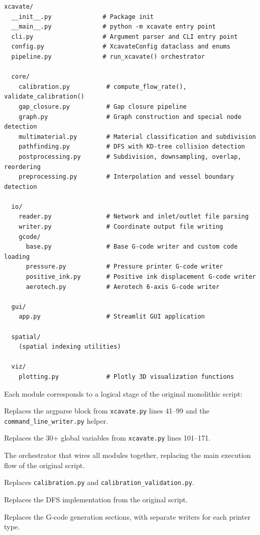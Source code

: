 \documentclass[11pt,letterpaper]{article}
\newcommand{\code}[1]{\texttt{#1}}
\begin{document}
\begin{lstlisting}
xcavate/
  __init__.py              # Package init
  __main__.py              # python -m xcavate entry point
  cli.py                   # Argument parser and CLI entry point
  config.py                # XcavateConfig dataclass and enums
  pipeline.py              # run_xcavate() orchestrator

  core/
    calibration.py          # compute_flow_rate(), validate_calibration()
    gap_closure.py          # Gap closure pipeline
    graph.py                # Graph construction and special node detection
    multimaterial.py        # Material classification and subdivision
    pathfinding.py          # DFS with KD-tree collision detection
    postprocessing.py       # Subdivision, downsampling, overlap, reordering
    preprocessing.py        # Interpolation and vessel boundary detection

  io/
    reader.py               # Network and inlet/outlet file parsing
    writer.py               # Coordinate output file writing
    gcode/
      base.py               # Base G-code writer and custom code loading
      pressure.py           # Pressure printer G-code writer
      positive_ink.py       # Positive ink displacement G-code writer
      aerotech.py           # Aerotech 6-axis G-code writer

  gui/
    app.py                  # Streamlit GUI application

  spatial/
    (spatial indexing utilities)

  viz/
    plotting.py             # Plotly 3D visualization functions
\end{lstlisting}

\begin{claudebox}
Each module corresponds to a logical stage of the original monolithic script:
\begin{description}[leftmargin=1cm,nosep]
    \item[\code{cli.py}] Replaces the argparse block from \code{xcavate.py}
    lines 41--99 and the \code{command\_line\_writer.py} helper.
    \item[\code{config.py}] Replaces the 30+ global variables from
    \code{xcavate.py} lines 101--171.
    \item[\code{pipeline.py}] The orchestrator that wires all modules together,
    replacing the main execution flow of the original script.
    \item[\code{core/calibration.py}] Replaces \code{calibration.py} and
    \code{calibration\_validation.py}.
    \item[\code{core/pathfinding.py}] Replaces the DFS implementation from the
    original script.
    \item[\code{io/gcode/}] Replaces the G-code generation sections, with
    separate writers for each printer type.
\end{description}
\end{claudebox}
\end{document}

